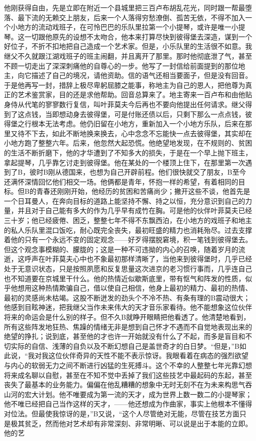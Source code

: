 \documentclass[12pt, UTF8]{ctexbook}
\begin{document}
\par 他刚获得自由，先是立即在附近一个县城里把三百卢布胡乱花光，同时跟一帮最堕落、最下流的无赖交上朋友，后来一个人落得穷愁潦倒、孤苦无依，不得不加入一个小地方的流动戏班子，在可怜巴巴的乐队里拉第一个小提琴，或许是唯一小提琴。这一切跟他原先的设想不太吻合，他本来打算尽快到彼得堡去深造，谋到一个好位子，不折不扣地把自己造成一个艺术家。但是，小乐队里的生活很不如意。我继父不久就跟江湖戏班子的班主闹翻，并且离开了那里。那时他彻底泄了气，甚至不顾一切走出了深深刺痛他的自尊心的一步。他写了一封信给前面提到的那位地主，向它描述了自己的境况，请他资助。信的语气还相当要面子，但是没有回音。于是他再写一封，措辞上极尽卑躬屈膝之能事，称地主为自己的恩人，把他尊为真正的艺术鉴赏家，目的还是求他帮助。回音总算来了。地主寄来一百卢布和由他贴身侍从代笔的寥寥数行复信，叫叶菲莫夫今后再也不要向他提出任何请求。继父得到了这点钱，当即想动身去彼得堡，可是付账还债以后，只剩下那么一点点钱，彼得堡之行根本无法考虑。他仍旧留在小地方，重新加入一个小地方乐队，后来在那里又待不下去，如此不断地换来换去，心中念念不忘能快一点去彼得堡，其实却在小地方跑了整整六年。后来，他忽然大起恐慌。他绝望地发现，在不规则的、贫困的生活不断折磨下，他的才华遭到了不知多大的损失，于是在一个早上抛下班主，拿起提琴，几乎靠乞讨走到彼得堡。他在某处的一个楼顶上住下，在那里第一次遇到了B，彼时B刚从德国来，也想为自己开辟前程。他们很快就交了朋友，B至今还满怀深情回忆他们相交一场。他俩都是青年，怀抱一样的希望，有着相同的目标。但B的青春还刚刚开始，他经历的贫困和苦痛尚少；撇开这些不谈，他首先是一个日耳曼人，在奔向目标的道路上能坚持不懈、持之以恒，充分意识到自己的力量，并且对于自己能有多大的作为几乎早有成竹在胸。可是他的伙伴叶菲莫夫已经三十岁；他已经疲倦、困乏，整整七年不得不东飘西泊，在小地方的戏班子和地主的私人乐队里混口饭吃，耐心既完全丧失，最初旺盛的精力也消耗殆尽。过去支撑着他的只有一个永远不变的固定观念——好歹得摆脱窘境，积一笔钱到彼得堡去。但这个观念事模糊的、朦胧的；这是一种不可违拗的内心的召唤，随着岁月的流逝，这呼声在叶菲莫夫心中也不象最初那样清晰了，当他来到彼得堡时，几乎已经处于无意识状态，只是按照夙愿和反复思量这次进京的老习惯行事而，几乎连自己也不知道要在京城里干什么。他的热情近似歇斯底里，带有怄气和阵发的性质，似乎他想用这种热情欺骗自己，借以使自己相信，他身上最初的精力、最初的热情、最初的灵感尚未枯竭。这股不断迸发的劲头个不冷不热、有条有理的B震动很大；他感到目眩神迷，把我继父当作未来伟大的天才音乐家看待。他不能想象这位伙伴将来的命运会是什么别的样子。但不久B就睁开眼睛把他看透了。他清楚地看到，所有这些阵发地狂热、焦躁的情绪无非是想到自己怀才不遇而不自觉地表现出来的绝望的挣扎；说到底，甚至他的才也许一开始就没有什么了不起，而多是盲目和不切实际的自信、浅薄的自负以及不断幻想自己是盖世奇才的白日梦。“但是，”B如此说，“我对我这位伙伴奇异的天性不能不表示惊讶。我眼看着在病态的强烈欲望与内心的软弱无力之间不断进行凶猛的生死搏斗。这个不幸的人整整七年光靠幻想将来成名聊以自慰，甚至在不知不觉中丢掉了我们这些技艺中最起码的东起，甚至丧失了最基本的业务能力。偏偏在他乱糟糟的想象中无时无刻不在为未来构思气吞山河的宏大计划。他不唯要成为第一流的天才，成为世界上数一数二的小提琴家；他不唯已经把自己当作这样的天才，——他还想成为作曲家，事实上他根本不懂得对位法。但最使我惊讶的是，”B又说，“这个人尽管绝对无能，尽管在技艺方面只是极其贫乏，然而他对艺术却有非常深刻、非常明晰、可以说是出于本能的立即。他的艺
\end{document}
